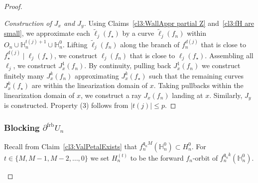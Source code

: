 \documentclass[]{amsart}
\newcommand{\fH}{{\mathbb H}}
\newcommand{\str}{{\star}}
\renewcommand{\qq}{\mathfrak{q}}
\newcommand\frb{{\operatorname{frb}}}
\theoremstyle{remark}
\numberwithin{equation}{section}
\theoremstyle{definition}
\begin{document}
\begin{proof}
\begin{proof}[Construction of $J_{x}$ and $J_y$]
 Using Claims~\ref{cl3:WallAppr partial Z} and~\ref{cl3:fH are small}, we approximate each $\widetilde \ell_j (f_\str)$ by a curve $\widetilde \ell_j (f_n)$ within $O_n \cup \fH_{n}^{ t(j)+1}\cup\fH_{n}^{ 0}$. Lifting $\widetilde \ell_j (f_n)$ along the branch of $f_n^{d(j)}$ that is close to $f_\str^{d(j)}\mid   \ell_j (f_\str)$, we construct $\ell_j(f_n)$ that is close to $\ell_j(f_\str)$. Assembling all $\ell_j$, we construct $J_{x}^{1}(f_n)$. By continuity, pulling back $J_{x}^{1}(f_n)$ we construct finitely many $J_{x}^{k}(f_n)$ approximating $J_{x}^{k}(f_\str)$ such that the remaining curves $J_{x}^{k}(f_\str)$ are within the linearization domain of $x$. Taking pullbacks within the linearization domain of $x$, we construct a ray  $J_x(f_n)$ landing at $x$. Similarly,  $J_y$ is constructed. Property (3) follows from $|t(j)|\le p$.
\end{proof}



\subsubsection{Blocking $\partial ^\frb U_n$}%
\label{sss:prf:thm:GlobParabFlower}

Recall from Claim~\eqref{cl3:ValPetalExists} that $f^{\qq_n M}_n(\fH^0_n)\subset H^0_n$. For $t\in \{M,M-1,M-2,\dots, 0\}$ we set $H_n^{(t)}$ to be the forward $f_n$-orbit of $f^{\qq_n k}_n(\fH^0_n)$. 





\begin{figure}


\end{figure}
\end{proof}
\end{document}
